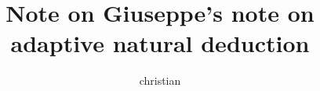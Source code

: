 \documentclass[11pt]{article}
\begin{document}
\title{Note on Giuseppe's note on adaptive natural deduction}
\author{christian}
\maketitle
%
\allowdisplaybreaks



\end{document}
